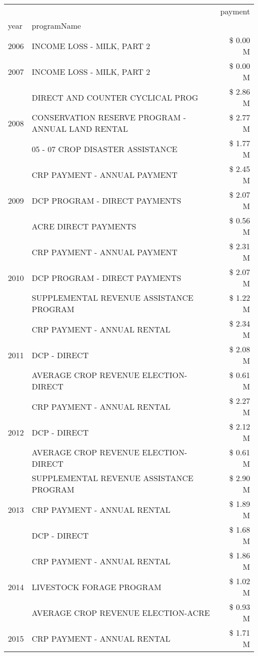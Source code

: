 \begin{tabular}{llr}
\toprule
 &  & payment \\
year & programName &  \\
\midrule
2006 & INCOME LOSS - MILK, PART 2 & \$ 0.00 M \\
\cline{1-3}
2007 & INCOME LOSS - MILK, PART 2 & \$ 0.00 M \\
\cline{1-3}
\multirow[t]{3}{*}{2008} & DIRECT AND COUNTER CYCLICAL PROG & \$ 2.86 M \\
 & CONSERVATION RESERVE PROGRAM - ANNUAL LAND RENTAL & \$ 2.77 M \\
 & 05 - 07 CROP DISASTER ASSISTANCE & \$ 1.77 M \\
\cline{1-3}
\multirow[t]{3}{*}{2009} & CRP PAYMENT - ANNUAL PAYMENT & \$ 2.45 M \\
 & DCP PROGRAM - DIRECT PAYMENTS & \$ 2.07 M \\
 & ACRE DIRECT PAYMENTS & \$ 0.56 M \\
\cline{1-3}
\multirow[t]{3}{*}{2010} & CRP PAYMENT - ANNUAL PAYMENT & \$ 2.31 M \\
 & DCP PROGRAM - DIRECT PAYMENTS & \$ 2.07 M \\
 & SUPPLEMENTAL REVENUE ASSISTANCE PROGRAM & \$ 1.22 M \\
\cline{1-3}
\multirow[t]{3}{*}{2011} & CRP PAYMENT - ANNUAL RENTAL & \$ 2.34 M \\
 & DCP - DIRECT & \$ 2.08 M \\
 & AVERAGE CROP REVENUE ELECTION-DIRECT & \$ 0.61 M \\
\cline{1-3}
\multirow[t]{3}{*}{2012} & CRP PAYMENT - ANNUAL RENTAL & \$ 2.27 M \\
 & DCP - DIRECT & \$ 2.12 M \\
 & AVERAGE CROP REVENUE ELECTION-DIRECT & \$ 0.61 M \\
\cline{1-3}
\multirow[t]{3}{*}{2013} & SUPPLEMENTAL REVENUE ASSISTANCE PROGRAM & \$ 2.90 M \\
 & CRP PAYMENT - ANNUAL RENTAL & \$ 1.89 M \\
 & DCP - DIRECT & \$ 1.68 M \\
\cline{1-3}
\multirow[t]{3}{*}{2014} & CRP PAYMENT - ANNUAL RENTAL & \$ 1.86 M \\
 & LIVESTOCK FORAGE PROGRAM & \$ 1.02 M \\
 & AVERAGE CROP REVENUE ELECTION-ACRE & \$ 0.93 M \\
\cline{1-3}
\multirow[t]{3}{*}{2015} & CRP PAYMENT - ANNUAL RENTAL & \$ 1.71 M \\

\end{tabular}
